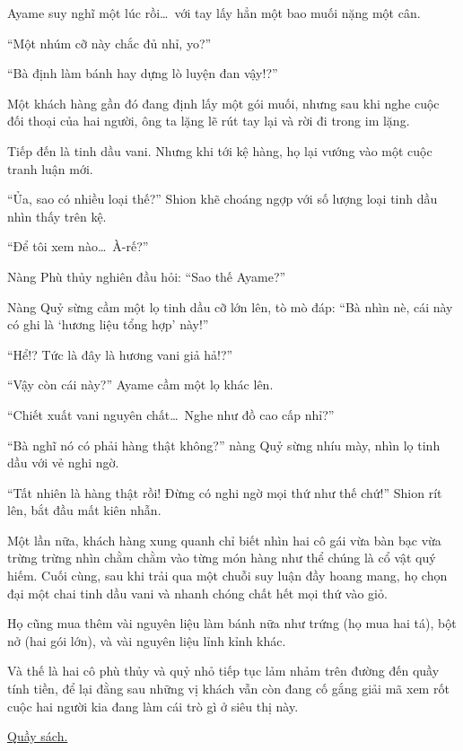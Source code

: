 \documentclass[../main.tex]{subfiles}
\begin{document}
Ayame suy nghĩ một lúc rồi\dots\ với tay lấy hẳn một bao muối nặng một cân.

``Một nhúm cỡ này chắc đủ nhỉ, yo?''

``Bà định làm bánh hay dựng lò luyện đan vậy!?''

Một khách hàng gần đó đang định lấy một gói muối, nhưng sau khi nghe cuộc đối thoại của hai người, ông ta lặng lẽ rút tay lại và rời đi trong im lặng.

Tiếp đến là tinh dầu vani. Nhưng khi tới kệ hàng, họ lại vướng vào một cuộc tranh luận mới.

``Ủa, sao có nhiều loại thế?'' Shion khẽ choáng ngợp với số lượng loại tinh dầu nhìn thấy trên kệ.

``Để tôi xem nào\dots\ À-rế?''

Nàng Phù thủy nghiên đầu hỏi: ``Sao thế Ayame?''

Nàng Quỷ sừng cầm một lọ tinh dầu cỡ lớn lên, tò mò đáp: ``Bà nhìn nè, cái này có ghi là `hương liệu tổng hợp' này!''

``Hể!? Tức là đây là hương vani giả hả!?''

``Vậy còn cái này?'' Ayame cầm một lọ khác lên.

``Chiết xuất vani nguyên chất\dots\ Nghe như đồ cao cấp nhỉ?''

``Bà nghĩ nó có phải hàng thật không?'' nàng Quỷ sừng nhíu mày, nhìn lọ tinh dầu với vẻ nghi ngờ.

``Tất nhiên là hàng thật rồi! Đừng có nghi ngờ mọi thứ như thế chứ!'' Shion rít lên, bắt đầu mất kiên nhẫn.

Một lần nữa, khách hàng xung quanh chỉ biết nhìn hai cô gái vừa bàn bạc vừa trừng trừng nhìn chằm chằm vào từng món hàng như thể chúng là cổ vật quý hiếm. Cuối cùng, sau khi trải qua một chuỗi suy luận đầy hoang mang, họ chọn đại một chai tinh dầu vani và nhanh chóng chất hết mọi thứ vào giỏ.

Họ cũng mua thêm vài nguyên liệu làm bánh nữa như trứng (họ mua hai tá), bột nở (hai gói lớn), và vài nguyên liệu lỉnh kỉnh khác.

Và thế là hai cô phù thủy và quỷ nhỏ tiếp tục lảm nhảm trên đường đến quầy tính tiền, để lại đằng sau những vị khách vẫn còn đang cố gắng giải mã xem rốt cuộc hai người kia đang làm cái trò gì ở siêu thị này.

\ct

\begin{center}
    \uline{Quầy sách.}
\end{center}
\end{document}
